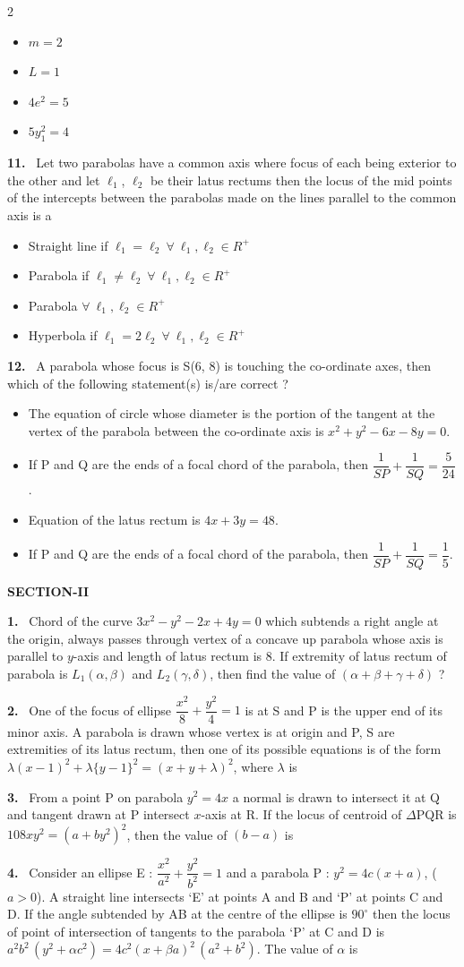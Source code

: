 \documentclass[10pt]{extarticle}
\newcommand{\sect}[1]{\par\smallskip\noindent\textbf{#1}\par}
\newcommand{\qn}[1]{\par\smallskip\noindent\textbf{#1.}~}
\newenvironment{qoptions}{\begin{itemize}[leftmargin=1.8em,itemsep=1pt,topsep=2pt,label={}]}{\end{itemize}}
\newcommand{\opt}[2]{\item[(#1)] #2}
\begin{document}
\begin{multicols}{2}
\begin{qoptions}
\opt{A}{$m=2$}
\opt{B}{$L=1$}
\opt{C}{$4e^2=5$}
\opt{D}{$5y_1^2=4$}
\end{qoptions}
\qn{11} Let two parabolas have a common axis where focus of each being exterior to the other and let $\ell_1$, $\ell_2$ be their latus rectums then the locus of the mid points of the intercepts between the parabolas made on the lines parallel to the common axis is a
\begin{qoptions}
\opt{A}{Straight line if $\ell_1=\ell_2\ \forall\ \ell_1,\ell_2\in R^+$}
\opt{B}{Parabola if $\ell_1\neq\ell_2\ \forall\ \ell_1,\ell_2\in R^+$}
\opt{C}{Parabola $\forall\ \ell_1,\ell_2\in R^+$}
\opt{D}{Hyperbola if $\ell_1=2\ell_2\ \forall\ \ell_1,\ell_2\in R^+$}
\end{qoptions}
\qn{12} A parabola whose focus is S(6, 8) is touching the co-ordinate axes, then which of the following statement(s) is/are correct ?
\begin{qoptions}
\opt{A}{The equation of circle whose diameter is the portion of the tangent at the vertex of the parabola between the co-ordinate axis is $x^2+y^2-6x-8y=0$.}
\opt{B}{If P and Q are the ends of a focal chord of the parabola, then $\dfrac1{SP}+\dfrac1{SQ}=\dfrac5{24}$.}
\opt{C}{Equation of the latus rectum is $4x+3y=48$.}
\opt{D}{If P and Q are the ends of a focal chord of the parabola, then $\dfrac1{SP}+\dfrac1{SQ}=\dfrac15$.}
\end{qoptions}
\sect{SECTION-II}
\qn{1} Chord of the curve $3x^2-y^2-2x+4y=0$ which subtends a right angle at the origin, always passes through vertex of a concave up parabola whose axis is parallel to $y$-axis and length of latus rectum is 8. If extremity of latus rectum of parabola is $L_1(\alpha,\beta)$ and $L_2(\gamma,\delta)$, then find the value of $(\alpha+\beta+\gamma+\delta)$ ?
\qn{2} One of the focus of ellipse $\dfrac{x^2}{8}+\dfrac{y^2}{4}=1$ is at S and P is the upper end of its minor axis. A parabola is drawn whose vertex is at origin and P, S are extremities of its latus rectum, then one of its possible equations is of the form $\lambda(x-1)^2+\lambda\{y-1\}^2=(x+y+\lambda)^2$, where $\lambda$ is
\qn{3} From a point P on parabola $y^2=4x$ a normal is drawn to intersect it at Q and tangent drawn at P intersect $x$-axis at R. If the locus of centroid of $\Delta$PQR is $108xy^2=(a+by^2)^2$, then the value of $(b-a)$ is
\qn{4} Consider an ellipse E : $\dfrac{x^2}{a^2}+\dfrac{y^2}{b^2}=1$ and a parabola P : $y^2=4c(x+a)$, ($a>0$). A straight line intersects `E' at points A and B and `P' at points C and D. If the angle subtended by AB at the centre of the ellipse is $90^\circ$ then the locus of point of intersection of tangents to the parabola `P' at C and D is $a^2b^2\,(y^2+\alpha c^2)=4c^2(x+\beta a)^2\,(a^2+b^2)$. The value of $\alpha$ is

\end{multicols}
\end{document}
